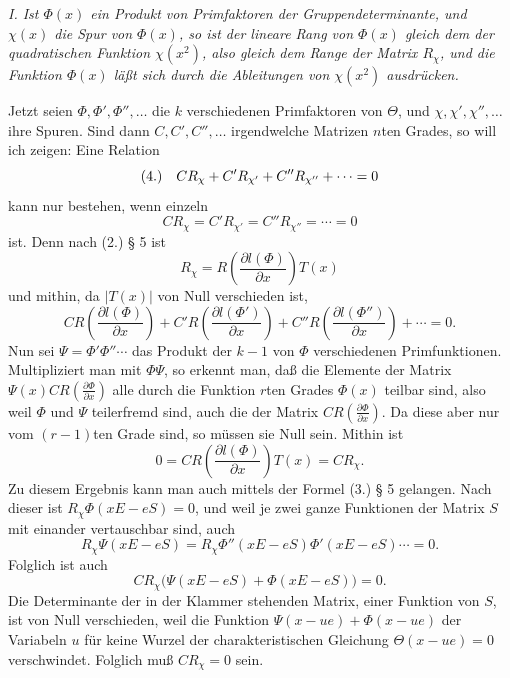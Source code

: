 \documentclass[11pt]{article}
\newcommand{\fnum}[1]{\textup{(\ensuremath{#1}.)}\quad}
\begin{document}
\emph{I. Ist $\Phi(x)$ ein Produkt von Primfaktoren der Gruppendeterminante, und $\chi(x)$ die Spur von $\Phi(x)$, so ist der lineare Rang von $\Phi(x)$ gleich dem der quadratischen Funktion $\chi(x^2)$, also gleich dem Range der Matrix $R_\chi$, und die Funktion $\Phi(x)$ läßt sich durch die Ableitungen von $\chi(x^2)$ ausdrücken.}

Jetzt seien $\Phi,\Phi',\Phi'',\ldots$ die $k$ verschiedenen Primfaktoren von $\Theta$, und $\chi,\chi',\chi'',\ldots$ ihre Spuren. Sind dann $C,C',C'',\ldots$ irgendwelche Matrizen $n$ten Grades, so will ich zeigen: Eine Relation
\[
\fnum{4} CR_\chi+C'R_{\chi'}+C''R_{\chi''}+\cdots=0
\]
kann nur bestehen, wenn einzeln
\[
 CR_\chi=C'R_{\chi'}=C''R_{\chi''}=\cdots=0
\]
ist. Denn nach (2.) § 5 ist
\[
 R_\chi=R\!\left(\frac{\partial l(\Phi)}{\partial x}\right)T(x)
\]
und mithin, da $|T(x)|$ von Null verschieden ist,
\[
 CR\!\left(\frac{\partial l(\Phi)}{\partial x}\right)
+C'R\!\left(\frac{\partial l(\Phi')}{\partial x}\right)
+C''R\!\left(\frac{\partial l(\Phi'')}{\partial x}\right)+\cdots=0.
\]
Nun sei $\Psi=\Phi'\Phi''\cdots$ das Produkt der $k-1$ von $\Phi$ verschiedenen Primfunktionen. Multipliziert man mit $\Phi\Psi$, so erkennt man, daß die Elemente der Matrix $\Psi(x)CR\!\left(\frac{\partial\Phi}{\partial x}\right)$ alle durch die Funktion $r$ten Grades $\Phi(x)$ teilbar sind, also weil $\Phi$ und $\Psi$ teilerfremd sind, auch die der Matrix $CR\!\left(\frac{\partial\Phi}{\partial x}\right)$. Da diese aber nur vom $(r-1)$ten Grade sind, so müssen sie Null sein. Mithin ist
\[
 0=CR\!\left(\frac{\partial l(\Phi)}{\partial x}\right)T(x)=CR_\chi.
\]
Zu diesem Ergebnis kann man auch mittels der Formel (3.) § 5 gelangen. Nach dieser ist $R_\chi\Phi(xE-eS)=0$, und weil je zwei ganze Funktionen der Matrix $S$ mit einander vertauschbar sind, auch
\[
 R_\chi\Psi(xE-eS)=R_\chi\Phi''(xE-eS)\Phi'(xE-eS)\cdots=0.
\]
Folglich ist auch
\[
 CR_\chi\bigl(\Psi(xE-eS)+\Phi(xE-eS)\bigr)=0.
\]
Die Determinante der in der Klammer stehenden Matrix, einer Funktion von $S$, ist von Null verschieden, weil die Funktion $\Psi(x-ue)+\Phi(x-ue)$ der Variabeln $u$ für keine Wurzel der charakteristischen Gleichung $\Theta(x-ue)=0$ verschwindet. Folglich muß $CR_\chi=0$ sein.
\end{document}

